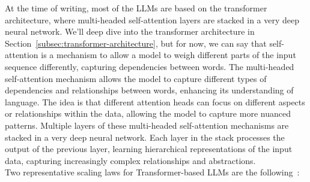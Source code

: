 At the time of writing, most of the LLMs are based on the transformer architecture, where multi-headed self-attention layers are stacked in a very deep neural network.
We'll deep dive into the transformer architecture in Section~\ref{subsec:transformer-architecture}, but for now, we can say that self-attention is a mechanism to allow a model to weigh different parts of the input sequence differently, capturing dependencies between words.
The multi-headed self-attention mechanism allows the model to capture different types of dependencies and relationships between words, enhancing its understanding of language.
The idea is that different attention heads can focus on different aspects or relationships within the data, allowing the model to capture more nuanced patterns.
Multiple layers of these multi-headed self-attention mechanisms are stacked in a very deep neural network.
Each layer in the stack processes the output of the previous layer, learning hierarchical representations of the input data, capturing increasingly complex relationships and abstractions. \\
Two representative scaling laws for Transformer-based LLMs are the following~\cite{kaplan2020scaling, hoffmann2022training}:
